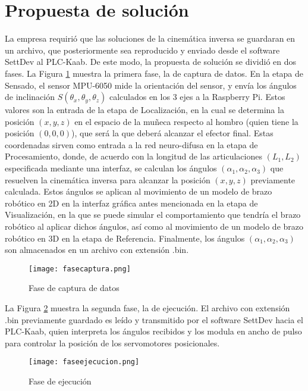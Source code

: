 \section{Propuesta de solución}

La empresa requirió que las soluciones de la cinemática inversa se guardaran en un archivo, que posteriormente sea reproducido y enviado desde el software SettDev al PLC-Kaab. De este modo, la propuesta de solución se dividió en dos fases. La Figura \ref{fig:fasecaptura} muestra la primera fase, la de captura de datos. En la etapa de Sensado, el sensor MPU-6050 mide la orientación del sensor, y envía los ángulos de inclinación $S(\theta_x, \theta_y, \theta_z)$ calculados en los 3 ejes a la Raspberry Pi. Estos valores son la entrada de la etapa de Localización, en la cual se determina la posición $(x, y, z)$ en el espacio de la muñeca respecto al hombro (quien tiene la posición $(0, 0, 0)$), que será la que deberá alcanzar el efector final. Estas coordenadas sirven como entrada a la red neuro-difusa en la etapa de Procesamiento, donde, de acuerdo con la longitud de las articulaciones $(L_1, L_2)$ especificada mediante una interfaz, se calculan los ángulos $(\alpha_1, \alpha_2, \alpha_3)$ que resuelven la cinemática inversa para alcanzar la posición $(x, y, z)$ previamente calculada. Estos ángulos se aplican al movimiento de un modelo de brazo robótico en 2D en la interfaz gráfica antes mencionada en la etapa de Visualización, en la que se puede simular el comportamiento que tendría el brazo robótico al aplicar dichos ángulos, así como al movimiento de un modelo de brazo robótico en 3D en la etapa de Referencia. Finalmente, los ángulos $(\alpha_1, \alpha_2, \alpha_3)$ son almacenados en un archivo con extensión .bin.

\begin{figure}[htb]
	\centering
	\texttt{[image: fasecaptura.png]}
	\caption{Fase de captura de datos}
	\label{fig:fasecaptura}
\end{figure}

\newpage
La Figura \ref{fig:faseejecucion} muestra la segunda fase, la de ejecución. El archivo con extensión .bin previamente guardado es leído y transmitido por el software SettDev hacia el PLC-Kaab, quien interpreta los ángulos recibidos y los modula en ancho de pulso para controlar la posición de los servomotores posicionales.

\begin{figure}[htb]
	\centering
	\texttt{[image: faseejecucion.png]}
	\caption{Fase de ejecución}
	\label{fig:faseejecucion}
\end{figure}
